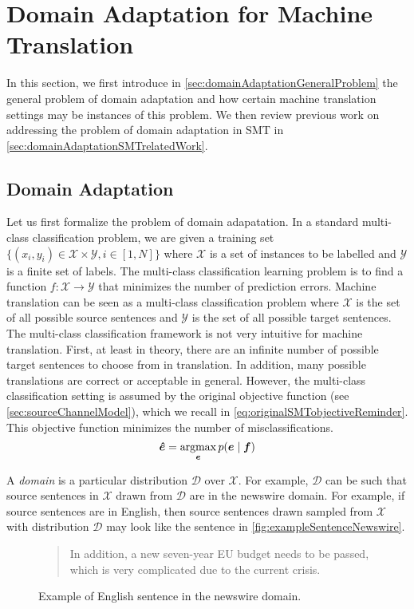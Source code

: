 \section{Domain Adaptation for Machine Translation}
\label{sec:domainAdaptationMT}

In this section, we first introduce in
\autoref{sec:domainAdaptationGeneralProblem} the general problem of domain
adaptation and how certain machine translation settings
may be instances of this problem. We then review
previous work on addressing the problem of domain adaptation
in SMT in \autoref{sec:domainAdaptationSMTrelatedWork}.

\subsection{Domain Adaptation}
\label{sec:domainAdaptationGeneralProblem}

Let us first formalize the problem of domain adapatation.
In a standard multi-class classification problem, we are
given a training set
$\{(x_i, y_i) \in \mathcal{X} \times \mathcal{Y}, i \in [1, N]\}$
where $\mathcal{X}$ is a set of instances to be labelled and
$\mathcal{Y}$ is a finite set of labels. The multi-class classification
learning problem
is to find a function $f : \mathcal{X} \rightarrow \mathcal{Y}$
that minimizes the number of prediction errors.
Machine translation
can be seen as a multi-class classification problem where $\mathcal{X}$
is the set of all possible source sentences and $\mathcal{Y}$ is the set of
all possible target sentences. The multi-class classification framework is not very intuitive
for machine translation. First, at least in theory, there are an
infinite number of possible target sentences to choose from in translation.
In addition, many possible translations are correct
or acceptable in general.
However, the multi-class classification setting is assumed by the original objective
function (see \autoref{sec:sourceChannelModel}), which we
recall in \autoref{eq:originalSMTobjectiveReminder}. This objective
function minimizes the number of misclassifications.
%
\begin{equation}
  \bm{\hat{e}} = \operatorname*{argmax}_{\bm{e}} p(\bm{e} \mid \bm{f})
  \label{eq:originalSMTobjectiveReminder}
\end{equation}
%

A \emph{domain} is a particular distribution $\mathcal{D}$
over $\mathcal{X}$. For example, $\mathcal{D}$ can be such that
source sentences in $\mathcal{X}$ drawn from $\mathcal{D}$ are
in the newswire
domain. For example, if source sentences are in English, then source sentences
drawn sampled from $\mathcal{X}$ with distribution $\mathcal{D}$
may look like
the sentence in \autoref{fig:exampleSentenceNewswire}.
%
\begin{figure}
  \begin{quote}
    In addition, a new seven-year EU budget needs to be passed, which is very complicated due to the current crisis.
  \end{quote}
  \caption{Example of English sentence in the newswire domain.}
  \label{fig:exampleSentenceNewswire}
\end{figure}
%

